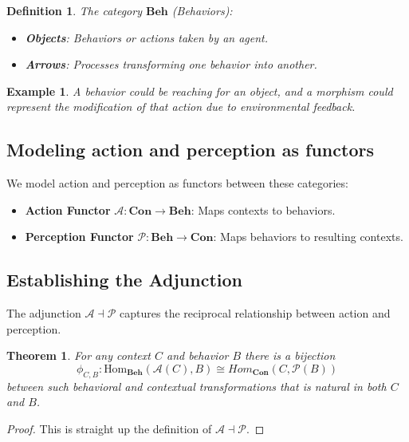 \documentclass{article}
\newtheorem{definition}{Definition}[section]
\newtheorem{theorem}{Theorem}[section]
\newtheorem{example}{Example}[section]
\begin{document}
\begin{definition} The category $\mathbf{Beh}$ (Behaviors):

    \begin{itemize}
        \item \textbf{Objects}: Behaviors or actions taken by an agent.
        \item \textbf{Arrows}: Processes transforming one behavior into another.
    \end{itemize}
\end{definition}

\begin{example} A behavior could be reaching for an object, and a morphism could represent the modification of that action due to environmental feedback. \end{example}

\subsection{Modeling action and perception as functors}
We model action and perception as functors between these categories:

\begin{itemize}
    \item \textbf{Action Functor} $\mathcal{A} \colon \mathbf{Con} \to \mathbf{Beh}$: Maps contexts to behaviors.
    \item \textbf{Perception Functor} $\mathcal{P} \colon \mathbf{Beh} \to \mathbf{Con}$: Maps behaviors to resulting contexts.
\end{itemize}

\subsection{Establishing the Adjunction}

The adjunction $\mathcal{A} \dashv \mathcal{P}$ captures the reciprocal relationship between action and perception.

\begin{theorem}
    For any context $C$ and behavior $B$ there is a bijection
    \[
        \phi_{C, B} \colon \text{Hom}_{\textbf{Beh}} ( \mathcal{A} (C), B) \cong Hom_{\textbf{Con}} (C, \mathcal{P}(B))
    \]
    between such behavioral and contextual transformations that is natural in both $C$ and $B$.
\end{theorem}
\begin{proof}
    This is straight up the definition of $\mathcal{A} \dashv \mathcal{P}$.
\end{proof}
\end{document}

